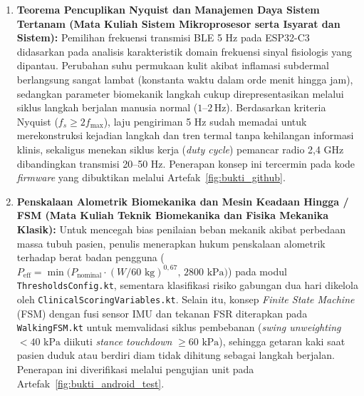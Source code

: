 \begin{enumerate}
    \item \textbf{Teorema Pencuplikan Nyquist dan Manajemen Daya Sistem Tertanam (Mata Kuliah Sistem Mikroprosesor serta Isyarat dan Sistem):}
    Pemilihan frekuensi transmisi BLE 5 Hz pada ESP32-C3 didasarkan pada analisis karakteristik domain frekuensi sinyal fisiologis yang dipantau. Perubahan suhu permukaan kulit akibat inflamasi subdermal berlangsung sangat lambat (konstanta waktu dalam orde menit hingga jam), sedangkan parameter biomekanik langkah cukup direpresentasikan melalui siklus langkah berjalan manusia normal ($1\text{--}2\,\mathrm{Hz}$). Berdasarkan kriteria Nyquist ($f_s \ge 2 f_{\max}$), laju pengiriman 5 Hz sudah memadai untuk merekonstruksi kejadian langkah dan tren termal tanpa kehilangan informasi klinis, sekaligus menekan siklus kerja (\textit{duty cycle}) pemancar radio 2,4 GHz dibandingkan transmisi 20--50 Hz. Penerapan konsep ini tercermin pada kode \textit{firmware} yang dibuktikan melalui Artefak~\ref{fig:bukti_github}.

    \item \textbf{Penskalaan Alometrik Biomekanika dan Mesin Keadaan Hingga / FSM (Mata Kuliah Teknik Biomekanika dan Fisika Mekanika Klasik):}
    Untuk mencegah bias penilaian beban mekanik akibat perbedaan massa tubuh pasien, penulis menerapkan hukum penskalaan alometrik terhadap berat badan pengguna ($P_{\text{eff}} = \min\big(P_{\text{nominal}} \cdot (W / 60\text{ kg})^{0,67},\, 2800\text{ kPa}\big)$) pada modul \texttt{ThresholdsConfig.kt}, sementara klasifikasi risiko gabungan dua hari dikelola oleh \texttt{ClinicalScoringVariables.kt}. Selain itu, konsep \textit{Finite State Machine} (FSM) dengan fusi sensor IMU dan tekanan FSR diterapkan pada \texttt{WalkingFSM.kt} untuk memvalidasi siklus pembebanan (\textit{swing unweighting} $< 40\text{ kPa}$ diikuti \textit{stance touchdown} $\ge 60\text{ kPa}$), sehingga getaran kaki saat pasien duduk atau berdiri diam tidak dihitung sebagai langkah berjalan. Penerapan ini diverifikasi melalui pengujian unit pada Artefak~\ref{fig:bukti_android_test}.


\end{enumerate}
